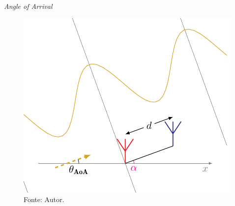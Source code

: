     \begin{frame}{\textit{Angle of Arrival}}
        \begin{figure}
            \centering
            \caption*{$ \theta_\text{AoA}=\SI{20}{\degree} $, $\textcolor{cmyk_M}{\alpha_{k}}=\SI{20}{\degree}$, $ \textcolor{Purple}{\beta_{\pm k}} = \SI{0}{\degree} $}
            \includegraphics{../pictures/AoA_4}
            \caption*{\tiny Fonte: Autor.}
        \end{figure}
    \end{frame}

